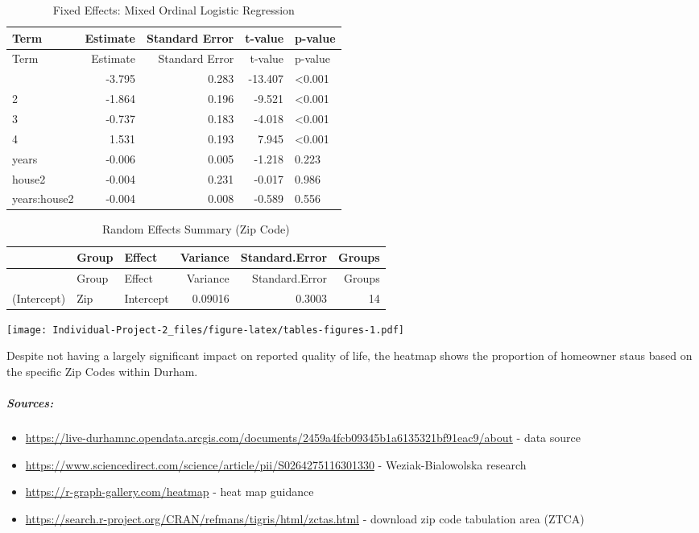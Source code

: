 \documentclass[
  4pt,
]{article}
\providecommand{\tightlist}{%
  \setlength{\itemsep}{0pt}\setlength{\parskip}{0pt}}
\begin{document}
\begin{longtable}[]{@{}lrrrl@{}}
\caption{Fixed Effects: Mixed Ordinal Logistic
Regression}\tabularnewline
\toprule\noalign{}
Term & Estimate & Standard Error & t-value & p-value \\
\midrule\noalign{}
\endfirsthead
\toprule\noalign{}
Term & Estimate & Standard Error & t-value & p-value \\
\midrule\noalign{}
\endhead
\bottomrule\noalign{}
\endlastfoot
1\textbar2 & -3.795 & 0.283 & -13.407 & \textless0.001 \\
2\textbar3 & -1.864 & 0.196 & -9.521 & \textless0.001 \\
3\textbar4 & -0.737 & 0.183 & -4.018 & \textless0.001 \\
4\textbar5 & 1.531 & 0.193 & 7.945 & \textless0.001 \\
years & -0.006 & 0.005 & -1.218 & 0.223 \\
house2 & -0.004 & 0.231 & -0.017 & 0.986 \\
years:house2 & -0.004 & 0.008 & -0.589 & 0.556 \\
\end{longtable}

\begin{longtable}[]{@{}lllrrr@{}}
\caption{Random Effects Summary (Zip Code)}\tabularnewline
\toprule\noalign{}
& Group & Effect & Variance & Standard.Error & Groups \\
\midrule\noalign{}
\endfirsthead
\toprule\noalign{}
& Group & Effect & Variance & Standard.Error & Groups \\
\midrule\noalign{}
\endhead
\bottomrule\noalign{}
\endlastfoot
(Intercept) & Zip & Intercept & 0.09016 & 0.3003 & 14 \\
\end{longtable}

\texttt{[image: Individual-Project-2\_files/figure-latex/tables-figures-1.pdf]}

Despite not having a largely significant impact on reported quality of
life, the heatmap shows the proportion of homeowner staus based on the
specific Zip Codes within Durham.

\subparagraph{Sources:}\label{sources}

\begin{itemize}
\tightlist
\item
  \url{https://live-durhamnc.opendata.arcgis.com/documents/2459a4fcb09345b1a6135321bf91eac9/about}
  - data source
\item
  \url{https://www.sciencedirect.com/science/article/pii/S0264275116301330}
  - Weziak-Bialowolska research
\item
  \url{https://r-graph-gallery.com/heatmap} - heat map guidance
\item
  \url{https://search.r-project.org/CRAN/refmans/tigris/html/zctas.html}
  - download zip code tabulation area (ZTCA)
\end{itemize}
\end{document}
